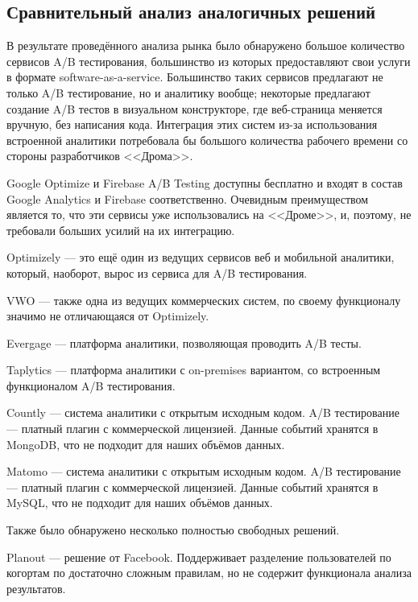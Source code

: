 \documentclass[../document.tex]{subfiles}
\begin{document}
	\subsection{Сравнительный анализ аналогичных решений}
	\par В результате проведённого анализа рынка было обнаружено большое количество сервисов A/B тестирования, большинство из которых предоставляют свои услуги в формате software-as-a-service. Большинство таких сервисов предлагают не только A/B тестирование, но и аналитику вообще; некоторые предлагают создание A/B тестов в визуальном конструкторе, где веб-страница меняется вручную, без написания кода. Интеграция этих систем из-за использования встроенной аналитики потребовала бы большого количества рабочего времени со стороны разработчиков <<Дрома>>.
	\par Google Optimize и Firebase A/B Testing \cite{optimize, firebase} доступны бесплатно и входят в состав Google Analytics и Firebase соответственно. Очевидным преимуществом является то, что эти сервисы уже использовались на <<Дроме>>, и, поэтому, не требовали больших усилий на их интеграцию.
	\par Optimizely \cite{optimizely} --- это ещё один из ведущих сервисов веб и мобильной аналитики, который, наоборот, вырос из сервиса для A/B тестирования.
	\par VWO \cite{vwo} --- также одна из ведущих коммерческих систем, по своему функционалу значимо не отличающаяся от Optimizely.
	\par Evergage \cite{evergage} --- платформа аналитики, позволяющая проводить A/B тесты.
	\par Taplytics \cite{taplytics} --- платформа аналитики с on-premises вариантом, со встроенным функционалом A/B тестирования.
	\par Countly \cite{countly} --- система аналитики с открытым исходным кодом. A/B тестирование --- платный плагин с коммерческой лицензией. Данные событий хранятся в MongoDB, что не подходит для наших объёмов данных.
	\par Matomo \cite{matomo} --- система аналитики с открытым исходным кодом. A/B тестирование --- платный плагин с коммерческой лицензией. Данные событий хранятся в MySQL, что не подходит для наших объёмов данных.
	\par Также было обнаружено несколько полностью свободных решений.
	\par Planout \cite{planout} --- решение от Facebook. Поддерживает разделение пользователей по когортам по достаточно сложным правилам, но не содержит функционала анализа результатов.
\end{document}
